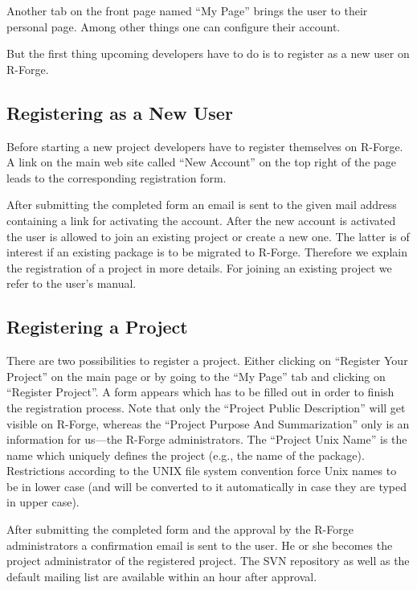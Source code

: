 Another tab on the front page named ``My Page'' brings the user to
their personal page. Among other things one can configure their
account. 

But the first thing upcoming developers have to do is to register as a
new user on R-Forge.

\subsection{Registering as a New User}

Before starting a new project developers have to register themselves
on R-Forge. A link on the main web site called ``New Account'' on the
top right of the page leads to the corresponding registration form.

After submitting the completed form an email is sent to the given mail
address containing a link for activating the account. After the
new account is activated the user is allowed to join an existing project or
create a new one.
The latter is of interest if an
existing package is to be migrated to R-Forge. Therefore we explain
the registration of a project in more details. For joining an existing
project we refer to the user's manual.

\subsection{Registering a Project}

There are two possibilities to register a project. Either clicking on
``Register Your Project'' on the main page  or by going to the ``My
Page'' tab and clicking on ``Register Project''. A form appears which
has to be filled out in order to finish the registration process. Note
that only the ``Project Public Description'' will get visible on R-Forge, whereas
the ``Project Purpose And Summarization'' only is an information for
us---the R-Forge administrators. The ``Project Unix Name'' is the name which
uniquely defines the project (e.g., the name of the
package). Restrictions according to the UNIX file system convention
force Unix names to be in lower case (and will
be converted to it automatically in case they are typed in upper
case).

After submitting the completed form and the approval by the R-Forge
administrators a confirmation email is sent to the user. He or she becomes
the project administrator of the registered project. The SVN
repository as well as the default mailing list are available within
an hour after approval.

